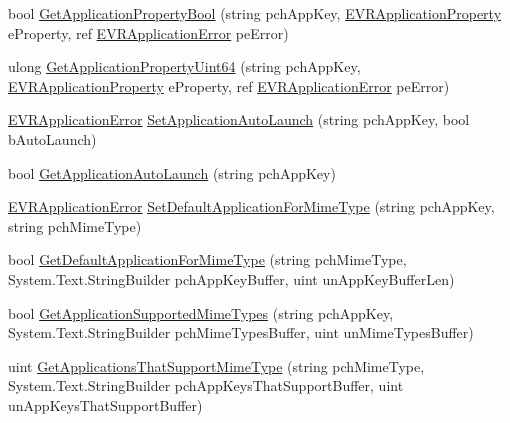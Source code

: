 \begin{DoxyCompactItemize}
\item 
bool \mbox{\hyperlink{class_valve_1_1_v_r_1_1_c_v_r_applications_a74331bcd543f67a795e07b5b488ea492}{Get\+Application\+Property\+Bool}} (string pch\+App\+Key, \mbox{\hyperlink{namespace_valve_1_1_v_r_a60802f09ad1b4764cd5bc78369d50bf3}{E\+V\+R\+Application\+Property}} e\+Property, ref \mbox{\hyperlink{namespace_valve_1_1_v_r_a3488adab8a219b579fcee50f4e63a8b6}{E\+V\+R\+Application\+Error}} pe\+Error)
\item 
ulong \mbox{\hyperlink{class_valve_1_1_v_r_1_1_c_v_r_applications_aaf2b2e7b063089791120ecc1be6653f9}{Get\+Application\+Property\+Uint64}} (string pch\+App\+Key, \mbox{\hyperlink{namespace_valve_1_1_v_r_a60802f09ad1b4764cd5bc78369d50bf3}{E\+V\+R\+Application\+Property}} e\+Property, ref \mbox{\hyperlink{namespace_valve_1_1_v_r_a3488adab8a219b579fcee50f4e63a8b6}{E\+V\+R\+Application\+Error}} pe\+Error)
\item 
\mbox{\hyperlink{namespace_valve_1_1_v_r_a3488adab8a219b579fcee50f4e63a8b6}{E\+V\+R\+Application\+Error}} \mbox{\hyperlink{class_valve_1_1_v_r_1_1_c_v_r_applications_af7ec150b8228b6af3d2ea930df7cd2a5}{Set\+Application\+Auto\+Launch}} (string pch\+App\+Key, bool b\+Auto\+Launch)
\item 
bool \mbox{\hyperlink{class_valve_1_1_v_r_1_1_c_v_r_applications_a22d741776c2c6ba49488b3f74b1308d4}{Get\+Application\+Auto\+Launch}} (string pch\+App\+Key)
\item 
\mbox{\hyperlink{namespace_valve_1_1_v_r_a3488adab8a219b579fcee50f4e63a8b6}{E\+V\+R\+Application\+Error}} \mbox{\hyperlink{class_valve_1_1_v_r_1_1_c_v_r_applications_afa7ac9cfb351f15a0127e3008f90ae02}{Set\+Default\+Application\+For\+Mime\+Type}} (string pch\+App\+Key, string pch\+Mime\+Type)
\item 
bool \mbox{\hyperlink{class_valve_1_1_v_r_1_1_c_v_r_applications_a528bd8591b4d08aac8cff149c19f0b89}{Get\+Default\+Application\+For\+Mime\+Type}} (string pch\+Mime\+Type, System.\+Text.\+String\+Builder pch\+App\+Key\+Buffer, uint un\+App\+Key\+Buffer\+Len)
\item 
bool \mbox{\hyperlink{class_valve_1_1_v_r_1_1_c_v_r_applications_ae01c2c507726be5dcce1121e7c4ad78a}{Get\+Application\+Supported\+Mime\+Types}} (string pch\+App\+Key, System.\+Text.\+String\+Builder pch\+Mime\+Types\+Buffer, uint un\+Mime\+Types\+Buffer)
\item 
uint \mbox{\hyperlink{class_valve_1_1_v_r_1_1_c_v_r_applications_af02538684a9bf0bbdac9e0e956c3b658}{Get\+Applications\+That\+Support\+Mime\+Type}} (string pch\+Mime\+Type, System.\+Text.\+String\+Builder pch\+App\+Keys\+That\+Support\+Buffer, uint un\+App\+Keys\+That\+Support\+Buffer)

\end{DoxyCompactItemize}
